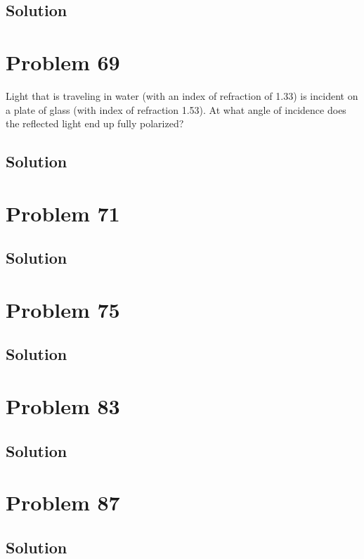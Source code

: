 \documentclass[12pt]{article}
\begin{document}
        \subsection{Solution}

    \pagebreak
    \section{Problem 69}
        Light that is traveling in water (with an index of refraction of 1.33) is incident on a plate of glass (with index of refraction 1.53). 
        At what angle of incidence does the reflected light end up fully polarized?

        \subsection{Solution}

    \pagebreak
    \section{Problem 71}

        \subsection{Solution}

    \pagebreak
    \section{Problem 75}

        \subsection{Solution}

    \pagebreak
    \section{Problem 83}

        \subsection{Solution}

    \pagebreak
    \section{Problem 87}

        \subsection{Solution}
\end{document}
